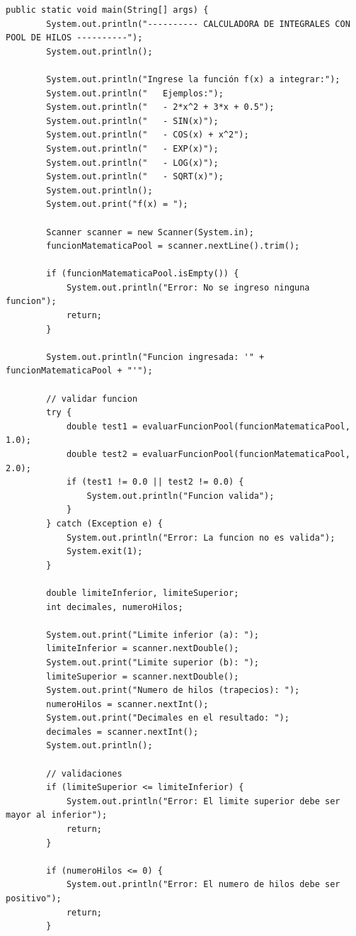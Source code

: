 \begin{lstlisting}[style=cpp-style, caption={Función Main en TrapecioPool.java }]
    public static void main(String[] args) {
        System.out.println("---------- CALCULADORA DE INTEGRALES CON POOL DE HILOS ----------");
        System.out.println();

        System.out.println("Ingrese la función f(x) a integrar:");
        System.out.println("   Ejemplos:");
        System.out.println("   - 2*x^2 + 3*x + 0.5");
        System.out.println("   - SIN(x)");
        System.out.println("   - COS(x) + x^2");
        System.out.println("   - EXP(x)");
        System.out.println("   - LOG(x)");
        System.out.println("   - SQRT(x)");
        System.out.println();
        System.out.print("f(x) = ");

        Scanner scanner = new Scanner(System.in);
        funcionMatematicaPool = scanner.nextLine().trim();

        if (funcionMatematicaPool.isEmpty()) {
            System.out.println("Error: No se ingreso ninguna funcion");
            return;
        }

        System.out.println("Funcion ingresada: '" + funcionMatematicaPool + "'");

        // validar funcion
        try {
            double test1 = evaluarFuncionPool(funcionMatematicaPool, 1.0);
            double test2 = evaluarFuncionPool(funcionMatematicaPool, 2.0);
            if (test1 != 0.0 || test2 != 0.0) {
                System.out.println("Funcion valida");
            }
        } catch (Exception e) {
            System.out.println("Error: La funcion no es valida");
            System.exit(1);
        }

        double limiteInferior, limiteSuperior;
        int decimales, numeroHilos;

        System.out.print("Limite inferior (a): ");
        limiteInferior = scanner.nextDouble();
        System.out.print("Limite superior (b): ");
        limiteSuperior = scanner.nextDouble();
        System.out.print("Numero de hilos (trapecios): ");
        numeroHilos = scanner.nextInt();
        System.out.print("Decimales en el resultado: ");
        decimales = scanner.nextInt();
        System.out.println();

        // validaciones
        if (limiteSuperior <= limiteInferior) {
            System.out.println("Error: El limite superior debe ser mayor al inferior");
            return;
        }

        if (numeroHilos <= 0) {
            System.out.println("Error: El numero de hilos debe ser positivo");
            return;
        }


\end{lstlisting}
